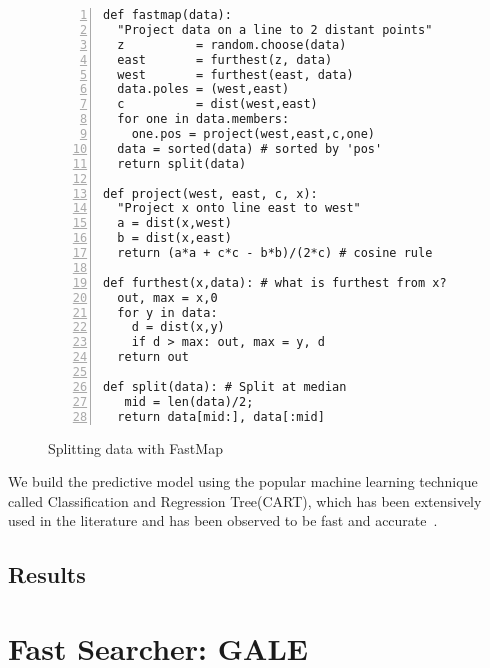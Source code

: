 \documentclass{sig-alternative}
\begin{document}
\begin{figure}[!t] 
\begin{minipage}{3.2in}
\begin{lstlisting}[mathescape,frame=l,numbers=left]
def fastmap(data): 
  "Project data on a line to 2 distant points"
  z          = random.choose(data)
  east       = furthest(z, data)
  west       = furthest(east, data)
  data.poles = (west,east)
  c          = dist(west,east)     
  for one in data.members: 
    one.pos = project(west,east,c,one)
  data = sorted(data) # sorted by 'pos'
  return split(data)

def project(west, east, c, x): 
  "Project x onto line east to west"
  a = dist(x,west)
  b = dist(x,east)
  return (a*a + c*c - b*b)/(2*c) # cosine rule

def furthest(x,data): # what is furthest from x?
  out, max = x,0
  for y in data:
    d = dist(x,y)
    if d > max: out, max = y, d
  return out

def split(data): # Split at median
   mid = len(data)/2; 
  return data[mid:], data[:mid]
\end{lstlisting}
\caption{Splitting data with FastMap}
\label{fig:fastmapCode}  
\end{minipage}
\end{figure}

We build the predictive model using the popular machine learning technique called Classification and Regression Tree(CART), which has been extensively used in the literature and has been observed to be fast and accurate~\cite{guo2013variability}.

\subsection{Results}


\section{Fast Searcher: GALE}
\end{document}
